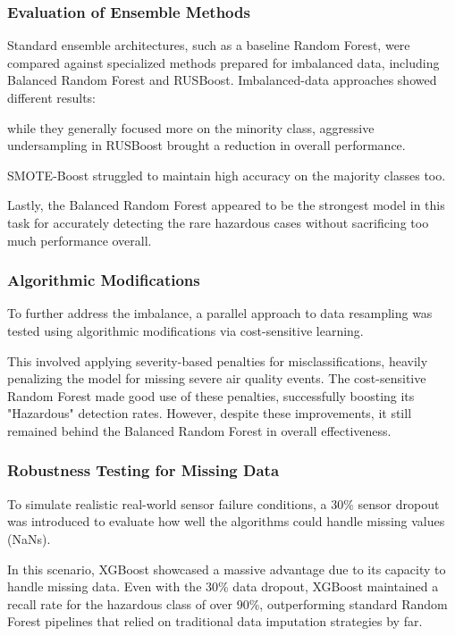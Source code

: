 \documentclass[a4paper,12pt]{article}
\begin{document}
	\subsubsection{Evaluation of Ensemble Methods}
	Standard ensemble architectures, such as a baseline Random Forest, were compared against specialized methods prepared for imbalanced data, including Balanced Random Forest and RUSBoost. Imbalanced-data approaches showed different results: 
	
	while they generally focused more on the minority class, aggressive undersampling in RUSBoost brought a reduction in overall performance.
	
	SMOTE-Boost struggled to maintain high accuracy on the majority classes too. 
	
	Lastly, the Balanced Random Forest appeared to be the strongest model in this task for accurately detecting the rare hazardous cases without sacrificing too much performance overall.
	
	\subsubsection{Algorithmic Modifications}
	To further address the imbalance, a parallel approach to data resampling was tested using algorithmic modifications via cost-sensitive learning. 
	
	This involved applying severity-based penalties for misclassifications, heavily penalizing the model for missing severe air quality events. The cost-sensitive Random Forest made good use of these penalties, successfully boosting its "Hazardous" detection rates. However, despite these improvements, it still remained behind the Balanced Random Forest in overall effectiveness.
	
	\subsubsection{Robustness Testing for Missing Data}
	To simulate realistic real-world sensor failure conditions, a 30\% sensor dropout was introduced to evaluate how well the algorithms could handle missing values (NaNs). 
	
	In this scenario, XGBoost showcased a massive advantage due to its capacity to handle missing data. Even with the 30\% data dropout, XGBoost maintained a recall rate for the hazardous class of over 90\%, outperforming standard Random Forest pipelines that relied on traditional data imputation strategies by far.
	
\end{document}
